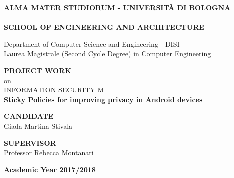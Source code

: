 \thispagestyle{empty}
\begin{titlepage}

\vspace*{-1.5cm}
\begin{center}
  \large
  \textbf{ALMA MATER STUDIORUM - UNIVERSIT\`A DI BOLOGNA}\\
  
  \hrulefill\\
  
  \textbf{SCHOOL OF ENGINEERING AND ARCHITECTURE}\\
  \vspace*{.75cm}
  
  
  Department of Computer Science and Engineering - DISI\\
  Laurea Magistrale (Second Cycle Degree) in Computer Engineering\\
  
  \vspace*{1.2cm}
  
  
  \textbf{PROJECT WORK}\\
  \vspace*{.4cm}
  on\\
  \vspace*{.4cm}
  INFORMATION SECURITY M\\

  \vspace*{2cm} \LARGE
  \textbf{Sticky Policies for improving privacy in Android devices}\\
 \end{center}
 
 \vspace*{3cm}
 
 \begin{flushleft}
  \textbf{CANDIDATE}\\ Giada Martina Stivala \\
\end{flushleft}

\vspace*{-2cm}

 \begin{flushright}
  \textbf{SUPERVISOR}\\ Professor Rebecca Montanari \\
 \end{flushright}


\vspace*{2cm}

\begin{center}
	\textbf{
  Academic Year 2017/2018\\
  }
\end{center} 
\clearpage
\end{titlepage}